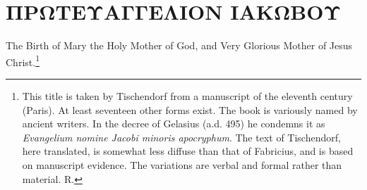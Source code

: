 \documentclass[12pt]{book} %
\begin{document}
\chapter*{ΠΡΩΤΕΥΑΓΓΕΛΙΟΝ ΙΑΚΩΒΟΥ}

The Birth of Mary the Holy Mother of God, and Very Glorious Mother of Jesus Christ.\footnote{This title is taken by Tischendorf from a manuscript of the eleventh century (Paris). At least seventeen other forms exist. The book is variously named by ancient writers. In the decree of Gelasius (a.d. 495) he condemns it as \textit{Evangelium nomine Jacobi minoris apocryphum}. The text of Tischendorf, here translated, is somewhat less diffuse than that of Fabricius, and is based on manuscript evidence. The variations are verbal and formal rather than material. R.}

\begin{pairs}
\begin{Leftside}\beginnumbering


\endnumbering\end{Leftside}
\begin{Rightside}\beginnumbering


\endnumbering\end{Rightside}
\end{pairs}
\Columns
\end{document}

